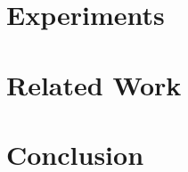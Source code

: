 \documentclass{llncs}
\newcommand{\0}{\mathbf{0}}
\newcommand{\1}{\mathbf{1}}
\begin{document}
\section{Experiments}
\label{section: experiments}

\section{Related Work}
\label{section: related work}

\section{Conclusion}



\end{document}
